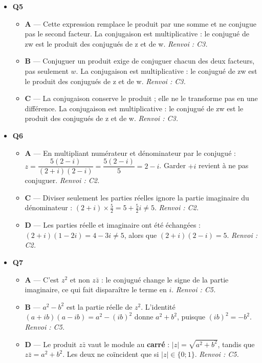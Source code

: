 \begin{itemize}
\begin{itemize}
    \item \textbf{B} — Quatrieme quadrant. Le point (-1,1) est dans le deuxième quadrant et forme un angle 3pi/4 avec l'axe réel positif. \emph{Renvoi : C4.}
    \item \textbf{D} — Troisième quadrant. Le point (-1,1) est dans le deuxième quadrant et forme un angle 3pi/4 avec l'axe réel positif. \emph{Renvoi : C4.}
  \end{itemize}
  \item \textbf{Q5}
  \begin{itemize}
    \item \textbf{A} — Cette expression remplace le produit par une somme et ne conjugue pas le second facteur. La conjugaison est multiplicative : le conjugué de zw est le produit des conjugués de z et de w. \emph{Renvoi : C3.}
    \item \textbf{B} — Conjuguer un produit exige de conjuguer chacun des deux facteurs, pas seulement $w$. La conjugaison est multiplicative : le conjugué de zw est le produit des conjugués de z et de w. \emph{Renvoi : C3.}
    \item \textbf{C} — La conjugaison conserve le produit ; elle ne le transforme pas en une différence. La conjugaison est multiplicative : le conjugué de zw est le produit des conjugués de z et de w. \emph{Renvoi : C3.}
  \end{itemize}
  \item \textbf{Q6}
  \begin{itemize}
    \item \textbf{A} — En multipliant numérateur et dénominateur par le conjugué : $z=\dfrac{5(2-i)}{(2+i)(2-i)}=\dfrac{5(2-i)}{5}=2-i$. Garder $+i$ revient à ne pas conjuguer. \emph{Renvoi : C2.}
    \item \textbf{C} — Diviser seulement les parties réelles ignore la partie imaginaire du dénominateur : $(2+i)\times\tfrac52=5+\tfrac52i\neq5$. \emph{Renvoi : C2.}
    \item \textbf{D} — Les parties réelle et imaginaire ont été échangées : $(2+i)(1-2i)=4-3i\neq5$, alors que $(2+i)(2-i)=5$. \emph{Renvoi : C2.}
  \end{itemize}
  \item \textbf{Q7}
  \begin{itemize}
    \item \textbf{A} — C'est $z^2$ et non $z\bar z$ : le conjugué change le signe de la partie imaginaire, ce qui fait disparaître le terme en $i$. \emph{Renvoi : C5.}
    \item \textbf{B} — $a^2-b^2$ est la partie réelle de $z^2$. L'identité $(a+ib)(a-ib)=a^2-(ib)^2$ donne $a^2+b^2$, puisque $(ib)^2=-b^2$. \emph{Renvoi : C5.}
    \item \textbf{D} — Le produit $z\bar z$ vaut le module au \textbf{carré} : $|z|=\sqrt{a^2+b^2}$, tandis que $z\bar z=a^2+b^2$. Les deux ne coïncident que si $|z|\in\{0;1\}$. \emph{Renvoi : C5.}
  \end{itemize}
\end{itemize}
\fi
